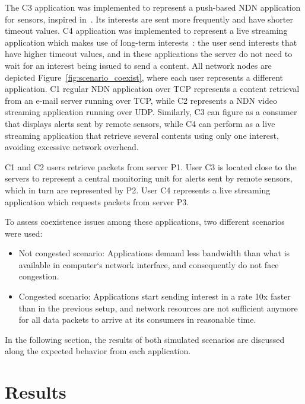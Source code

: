 \documentclass[11pt,conference]{./IEEEtran}
\begin{document}
	The C3 application was implemented to represent a push-based NDN application for sensors, inspired in~\cite{Tsilopoulos11}. Its interests are sent more frequently and have shorter timeout values. C4 application was implemented to represent a live streaming application which makes use of long-term interests~\cite{Yao12}: the user send interests that have higher timeout values, and in these applications the server do not need to wait for an interest being issued to send a content. All network nodes are depicted Figure~\ref{fig:scenario_coexist}, where each user represents a different application. C1 regular NDN application over TCP represents a content retrieval from an e-mail server running over TCP, while C2 represents a NDN video streaming application running over UDP. Similarly, C3 can figure as a consumer that displays alerts sent by remote sensors, while C4 can perform as a live streaming application that retrieve several contents using only one interest, avoiding excessive network overhead. 

	C1 and C2 users retrieve packets from server P1. User C3 is located close to the servers to represent a central monitoring unit for alerts sent by remote sensors, which in turn are represented by P2. User C4 represents a live streaming application which requests packets from server P3. 

	To assess coexistence issues among these applications, two different scenarios were used: 

	\begin{itemize}
		\item Not congested scenario: Applications demand less bandwidth than what is available in computer`s network interface, and consequently do not face congestion.
		
		\item Congested scenario: Applications start sending interest in a rate 10x faster than in the previous setup, and network resources are not sufficient anymore for all data packets to arrive at its consumers in reasonable time. 

	\end{itemize}

	In the following section, the results of both simulated scenarios are discussed along the expected behavior from each application.

	\section{Results}  \label{sec:results}
\end{document}
